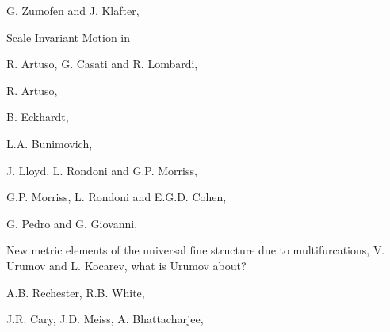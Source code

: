  G. Zumofen and J. Klafter, {\sf Scale Invariant Motion in

 R. Artuso, G. Casati and R. Lombardi,

 R. Artuso,


 B. Eckhardt,

 L.A. Bunimovich,



  J. Lloyd, L. Rondoni and G.P. Morriss,

  G.P. Morriss, L. Rondoni and E.G.D. Cohen,


 G. Pedro and G. Giovanni, %



 {New metric elements of the universal fine structure due to multifurcations},
 {V. Urumov and L. Kocarev},
{what is Urumov about?}

A.B. Rechester, R.B. White,

J.R. Cary, J.D. Meiss, A. Bhattacharjee,

}
